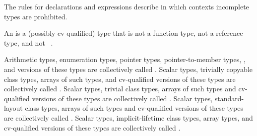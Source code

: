 \pnum
\begin{note}
The rules for declarations and expressions describe in which
contexts incomplete types are prohibited.
\end{note}

\pnum
An  is a (possibly cv-qualified) type that is not
a function type, not a reference type, and not \cv{}~.

\pnum
{}%
%
%
Arithmetic types, enumeration types,
pointer types, pointer-to-member types,
,
and
 versions of these
types are collectively called
.
Scalar types, trivially copyable class types,
arrays of such types, and cv-qualified versions of these
types are collectively called .
Scalar types, trivial class types,
arrays of such types and cv-qualified versions of these
types are collectively called
. Scalar types, standard-layout class
types, arrays of such types and
cv-qualified versions of these types
are collectively called .
Scalar types, implicit-lifetime class types,
array types, and cv-qualified versions of these types
are collectively called .

